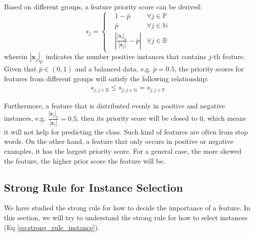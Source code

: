 Based on different groups, a feature priority score can be derived:
$$s_j = 
    \left\{ 
    \begin{aligned}
        & 1 - \bar{p}  & \forall j \in \mathbb{P} \\
        & \bar{p} & \forall j \in \mathbb{N} \\
        & \left|\frac{|\pmb{x}_j|_{\mathbb{P}}}{|\pmb{x}_j|} - \bar{p}\right| & \forall j \in \mathbb{B} 
    \end{aligned}
    \right.
$$
wherein $|\pmb{x}_j|_{\mathbb{P}}$ indicates the number positive instances that contains $j$-th feature. Given that $\bar{p} \in (0, 1)$ and a balanced data, e.g. $\bar{p} = 0.5$, the priority scores for features from different groups will satisfy the following relationship: 
\begin{align}
    s_{j:j\in \mathbb{B}} \leq s_{j:j\in \mathbb{N}}  = s_{j:j\in \mathbb{P}} \label{appendix_eq:relation}
\end{align}

Furthermore, a feature that is distributed evenly in positive and negative instances, e.g. $\frac{|\pmb{x}_j|_{\mathbb{P}}}{|\pmb{x}_j|} = 0.5$, then its priority score will be closed to $0$, which means it will not help for predicting the class. Such kind of features are often from stop words. On the other hand, a feature that only occurs in positive or negative examples, it has the largest priority score. For a general case, the more skewed the feature, the higher prior score the feature will be. 

\subsection{Strong Rule for Instance Selection}\label{appendix:instance_selection}
We have studied the strong rule for how to decide the importance of a feature. In this section, we will try to understand the strong rule for how to select instances (Eq \ref{eq:strong_rule_instance}).